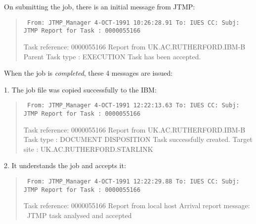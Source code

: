 On submitting the job, there is an initial message from JTMP:

\begin{quote}
{\small
\tt
From:	JTMP\_Manager  4-OCT-1991 10:26:28.91
\newline
To:	IUES        
\newline
CC:	
\newline
Subj:	JTMP Report for Task : 0000055166

Task reference: 0000055166
\newline
Report from UK.AC.RUTHERFORD.IBM-B
\newline
Parent Task type : EXECUTION
\newline
Task has been accepted.
}
\end{quote}

\rm
When the job is {\it completed}, these 4 messages are issued:

1. The job file was copied successfully to the IBM:

\begin{quote}
{\small
\tt
From:	JTMP\_Manager  4-OCT-1991 12:22:13.63
\newline
To:	IUES        
\newline
CC:	
\newline
Subj:	JTMP Report for Task : 0000055166

Task reference: 0000055166
\newline
Report from UK.AC.RUTHERFORD.IBM-B
\newline
Task type : DOCUMENT DISPOSITION
\newline
Task successfully created.
\newline
Target site : UK.AC.RUTHERFORD.STARLINK
}
\end{quote}

\rm
2. It understands the job and accepts it:

\begin{quote}
{\small
\tt
From:	JTMP\_Manager  4-OCT-1991 12:22:29.88
\newline
To:	IUES        
\newline
CC:	
\newline
Subj:	JTMP Report for Task : 0000055166

Task reference: 0000055166
\newline
Report from local host
\newline
Arrival report message: 
\newline ~JTMP task analysed and accepted
}
\end{quote}

